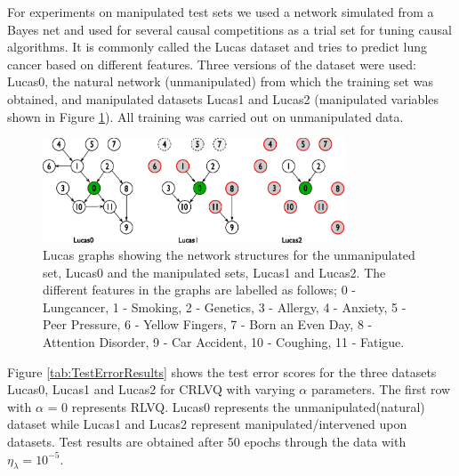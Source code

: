 \documentclass{esannV2}
\begin{document}
For experiments on manipulated test sets we used a network simulated from a Bayes net and used for several causal competitions as a trial set for tuning causal algorithms. It is commonly called the Lucas dataset\cite{12,13} and tries to predict lung cancer based on different features. Three versions of the dataset were used: Lucas0, the natural network (unmanipulated) from which the training set was obtained, and manipulated datasets Lucas1 and Lucas2 (manipulated variables shown in Figure \ref{fig:lucasgraph}). All training was carried out on unmanipulated data. 
\begin{figure}[t]
	\centering
		\includegraphics[width=0.8\textwidth]{lucasgraph.eps}
	\caption{\footnotesize{Lucas graphs showing the network structures for the unmanipulated set, Lucas0 and the manipulated sets, Lucas1 and Lucas2. The different features in the graphs are labelled as follows; 0 - Lungcancer, 1 - Smoking, 2 - Genetics, 3 - Allergy, 4 - Anxiety, 5 - Peer Pressure, 6 - Yellow Fingers, 7 - Born an Even Day, 8 - Attention Disorder, 9 - Car Accident, 10 - Coughing, 11 - Fatigue.}}
	\label{fig:lucasgraph}
\end{figure}

Figure \ref{tab:TestErrorResults} shows the test error scores for the three datasets Lucas0, Lucas1 and Lucas2 for CRLVQ with varying $\alpha$ parameters. The first row with $\alpha$ = 0 represents RLVQ. Lucas0 represents the unmanipulated(natural) dataset while Lucas1 and Lucas2 represent manipulated/intervened upon datasets. Test results are obtained after 50 epochs through the data with $\eta_\lambda = 10^{-5}$.
\end{document}
